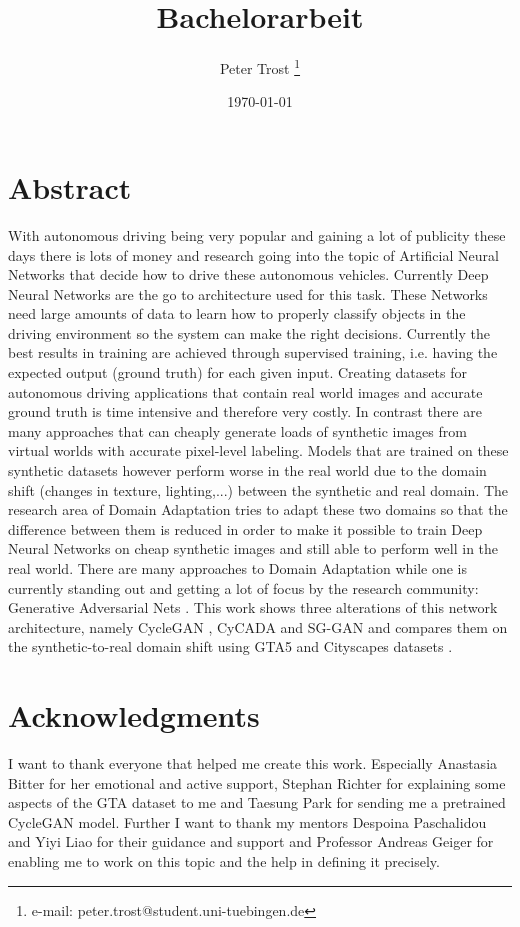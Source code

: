 \documentclass[a4paper,cleardoubleempty,BCOR1cm]{scrbook}
\title{Bachelorarbeit}
\author{Peter Trost \thanks{e-mail: peter.trost@student.uni-tuebingen.de}}
\date{\today}
\begin{document}


\chapter*{Abstract}
With autonomous driving being very popular and gaining a lot of publicity these days there is lots of money and research going into the topic of Artificial Neural Networks that decide how to drive these autonomous vehicles. Currently Deep Neural Networks are the go to architecture used for this task. These Networks need large amounts of data to learn how to properly classify objects in the driving environment so the system can make the right decisions. Currently the best results in training are achieved through supervised training, i.e. having the expected output (ground truth) for each given input. Creating datasets for autonomous driving applications that contain real world images and accurate ground truth is time intensive and therefore very costly. In contrast there are many approaches that can cheaply generate loads of synthetic images from virtual worlds with accurate pixel-level labeling. Models that are trained on these synthetic datasets however perform worse in the real world due to the domain shift (changes in texture, lighting,...) between the synthetic and real domain. The research area of Domain Adaptation tries to adapt these two domains so that the difference between them is reduced in order to make it possible to train Deep Neural Networks on cheap synthetic images and still able to perform well in the real world. There are many approaches to Domain Adaptation while one is currently standing out and getting a lot of focus by the research community: Generative Adversarial Nets \cite{NIPS2014_5423}. This work shows three alterations of this network architecture, namely CycleGAN \cite{DBLP:journals/corr/ZhuPIE17}, CyCADA \cite{DBLP:journals/corr/abs-1711-03213} and SG-GAN \cite{DBLP:journals/corr/abs-1801-01726} and compares them on the synthetic-to-real domain shift using GTA5 \cite{Richter_2016_ECCV} and Cityscapes datasets \cite{Cordts_2016_CVPR}.


\chapter*{Acknowledgments}
I want to thank everyone that helped me create this work. Especially Anastasia Bitter for her emotional and active support, Stephan Richter for explaining some aspects of the GTA dataset to me and Taesung Park for sending me a pretrained CycleGAN model. Further I want to thank my mentors Despoina Paschalidou and Yiyi Liao for their guidance and support and Professor Andreas Geiger for enabling me to work on this topic and the help in defining it precisely.
\end{document}
